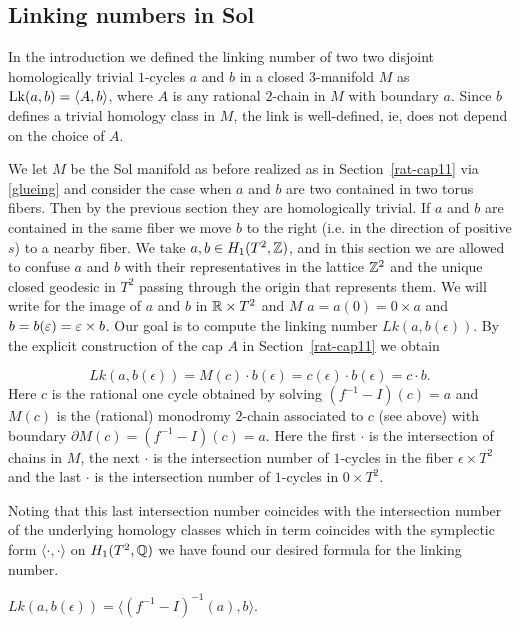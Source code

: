 \subsection{Linking numbers in Sol} \label{generaltheoryoflink}


In the introduction we defined the linking number of two two disjoint
homologically trivial $1$-cycles $a$ and $b$ in a closed $3$-manifold
$M$ as $\operatorname{Lk}(a,b) = \langle A,b \rangle$, where $A$ is any rational
$2$-chain in $M$ with boundary $a$. Since $b$ defines a trivial
homology class in $M$, the link is well-defined, ie, does not depend
on the choice of $A$.

We let $M$ be the Sol manifold as before realized as in
Section~\ref{rat-cap11} via \eqref{glueing} and consider the case
when $a$ and $b$ are two contained in two torus fibers. Then by the
previous section they are homologically trivial. If $a$ and $b$ are
contained in the same fiber we move $b$ to the right (i.e. in the
direction of positive $s$)  to a nearby fiber. We take $a,b \in
H_1(T^2,\mathbb{Z})$, and in this section we are allowed to confuse $a$ and
$b$ with their representatives in the lattice $\mathbb{Z}^2$ and the unique
closed geodesic in $T^2$ passing through the origin that represents
them. We will write for the image of $a$ and $b$ in $\mathbb{R} \times T^2$
and $M$ $a=a(0)=0 \times a$ and $b=b(\varepsilon)= \varepsilon \times b$. Our
goal is to compute the linking number $Lk(a, b(\epsilon))$. By the
explicit construction of the cap $A$ in Section~\ref{rat-cap11} we
obtain

\begin{lemma}
 \[
 Lk(a,b(\epsilon)) = M(c) \cdot b(\epsilon) = c(\epsilon) \cdot b(\epsilon)= c \cdot b.
 \] 
Here $c$ is the rational one cycle obtained by solving $(f^{-1} - I) (c) =a$
and $M(c)$ is the (rational) monodromy $2$-chain associated to $c$
(see above) with boundary $\partial M(c) = (f^{-1} - I) (c) =a$.
Here the first $\cdot$ is the intersection of
chains in $M$, the next $\cdot$ is the intersection number of
$1$-cycles in the fiber $\epsilon \times T^2$ and the last $\cdot$
is the intersection number of $1$-cycles in $0 \times T^2$.
 \end{lemma}

Noting that this last intersection number coincides with the
intersection number of the underlying homology classes which in
term coincides with the symplectic form $\langle \cdot, \cdot
\rangle$ on $H_1(T^2,\mathbb{Q})$ we have found our desired formula for the
linking number.
\begin{theorem}\label{linkSol}
$ Lk(a, b(\epsilon)) = \langle (f^{-1} - I)^{-1} (a), b \rangle.$
\end{theorem}

